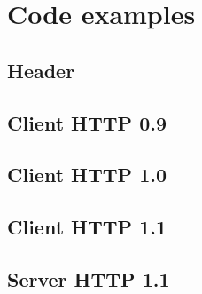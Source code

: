 \chapter{Code examples}
\section{Header}

\section{Client HTTP 0.9}

\section{Client HTTP 1.0}

\section{Client HTTP 1.1}

\section{Server HTTP 1.1}
